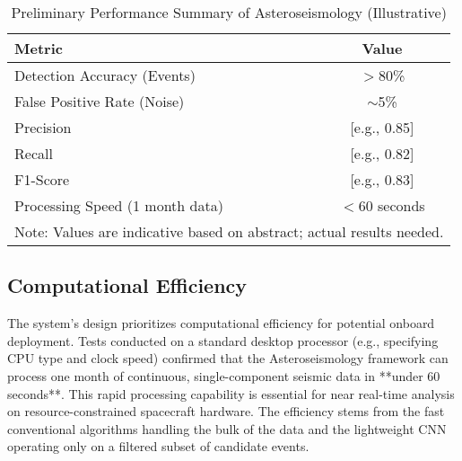 \documentclass[conference]{IEEEtran}
\begin{document}
\begin{table}[htbp]
    \caption{Preliminary Performance Summary of Asteroseismology (Illustrative)}
    \begin{center}
        \begin{tabular}{|l|c|}
            \hline
            \textbf{Metric}                 & \textbf{Value} \\
            \hline
            Detection Accuracy (Events)     & $>$80\%        \\
            False Positive Rate (Noise)     & $\sim$5\%      \\
            Precision                       & [e.g., 0.85]   \\
            Recall                          & [e.g., 0.82]   \\
            F1-Score                        & [e.g., 0.83]   \\
            Processing Speed (1 month data) & $<$60 seconds  \\
            \hline
            \multicolumn{2}{l}{Note: Values are indicative based on abstract; actual results needed.}
        \end{tabular}
        \label{tab:performance_summary}
    \end{center}
\end{table}


\subsection{Computational Efficiency}
The system's design prioritizes computational efficiency for potential onboard deployment. Tests conducted on a standard desktop processor (e.g., specifying CPU type and clock speed) confirmed that the Asteroseismology framework can process one month of continuous, single-component seismic data in **under 60 seconds**. This rapid processing capability is essential for near real-time analysis on resource-constrained spacecraft hardware. The efficiency stems from the fast conventional algorithms handling the bulk of the data and the lightweight CNN operating only on a filtered subset of candidate events.
\end{document}
